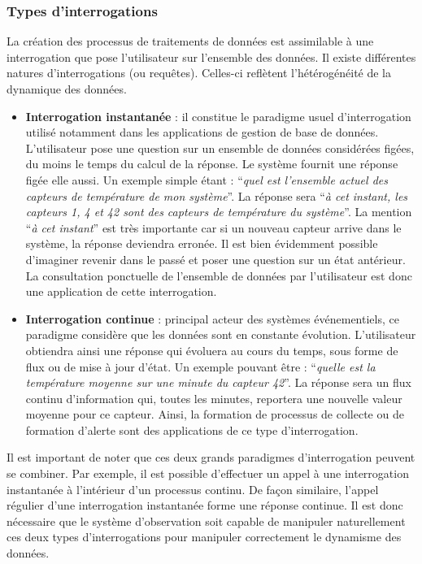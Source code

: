 \subsubsection{Types d'interrogations}
La création des processus de traitements de données est assimilable à une interrogation que pose l'utilisateur sur l'ensemble des données. Il existe différentes natures d'interrogations (ou requêtes). Celles-ci reflètent l'hétérogénéité de la dynamique des données.
\begin{itemize}
    \item \textbf{Interrogation instantanée} : il constitue le paradigme usuel d'interrogation utilisé notamment dans les applications de gestion de base de données. L'utilisateur pose une question sur un ensemble de données considérées figées, du moins le temps du calcul de la réponse. Le système fournit une réponse figée elle aussi. Un exemple simple étant : \enquote{\it quel est l'ensemble actuel des capteurs de température de mon système}. La réponse sera \enquote{\it à cet instant, les capteurs 1, 4 et 42 sont des capteurs de température du système}. La mention \enquote{\it à cet instant} est très importante car si un nouveau capteur arrive dans le système, la réponse deviendra erronée. Il est bien évidemment possible d'imaginer revenir dans le passé et poser une question sur un état antérieur. La consultation ponctuelle de l'ensemble de données par l'utilisateur est donc une application de cette interrogation.
    \item \textbf{Interrogation continue} : principal acteur des systèmes événementiels, ce paradigme considère que les données sont en constante évolution. L'utilisateur obtiendra ainsi une réponse qui évoluera au cours du temps, sous forme de flux ou de mise à jour d'état. Un exemple pouvant être : \enquote{\it quelle est la température moyenne sur une minute du capteur 42}. La réponse sera un flux continu d'information qui, toutes les minutes, reportera une nouvelle valeur moyenne pour ce capteur. Ainsi, la formation de processus de collecte ou de formation d'alerte sont des applications de ce type d'interrogation.
\end{itemize}
Il est important de noter que ces deux grands paradigmes d'interrogation peuvent se combiner. Par exemple, il est possible d'effectuer un appel à une interrogation instantanée à l'intérieur d'un processus continu. De façon similaire, l'appel régulier d'une interrogation instantanée forme une réponse continue. Il est donc nécessaire que le système d'observation soit capable de manipuler naturellement ces deux types d'interrogations pour manipuler correctement le dynamisme des données.


